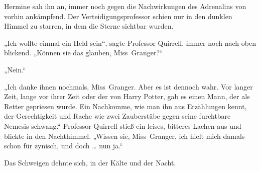 Hermine sah ihn an, immer noch gegen die Nachwirkungen des Adrenalins von vorhin ankämpfend. Der Verteidigungsprofessor schien nur in den dunklen Himmel zu starren, in dem die Sterne sichtbar wurden.

„Ich wollte einmal ein Held sein“, sagte Professor Quirrell, immer noch nach oben blickend.
„Können sie das glauben, Miss~Granger?“

„Nein.“

„Ich danke ihnen nochmals, Miss~Granger. Aber es ist dennoch wahr. Vor langer Zeit, lange vor ihrer Zeit oder der von Harry Potter, gab es einen Mann, der als Retter gepriesen wurde. Ein Nachkomme, wie man ihn aus Erzählungen kennt, der Gerechtigkeit und Rache wie zwei Zauberstäbe gegen seine furchtbare Nemesis schwang.“
Professor Quirrell stieß ein leises, bitteres Lachen aus und blickte in den Nachthimmel.
„Wissen sie, Miss~Granger, ich hielt mich damals schon für zynisch, und doch … nun ja.“

Das Schweigen dehnte sich, in der Kälte und der Nacht.

